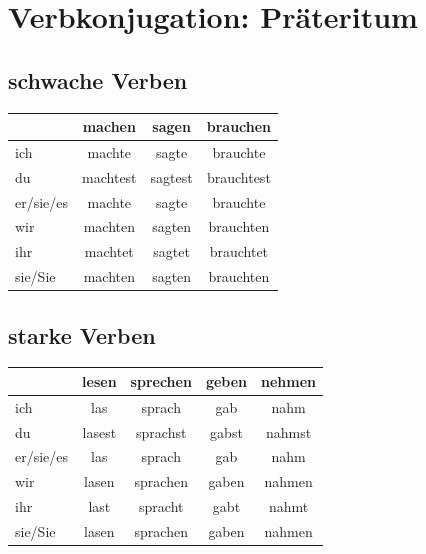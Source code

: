 \section{Verbkonjugation: Präteritum}
\label{sec:KonjugationPraeteritum}

\subsection{schwache Verben}
\label{sec:SchwacheVerbenPraet}

\begin{center}
\begin{tabular}{|l|c|c|c|}
\hline
\textbf{} & \textbf{machen} & \textbf{sagen} & \textbf{brauchen} \\ \hline
ich & machte & sagte & brauchte \\ \hline
du & machtest & sagtest & brauchtest \\ \hline
er/sie/es & machte & sagte & brauchte \\ \hline
wir & machten & sagten & brauchten \\ \hline
ihr & machtet & sagtet & brauchtet \\ \hline
sie/Sie & machten & sagten & brauchten \\ \hline
\end{tabular}
\end{center}

\subsection{starke Verben}
\label{sec:StarkeVerbenPraet}

\begin{center}
\begin{tabular}{|l|c|c|c|c|}
\hline
\textbf{} & \textbf{lesen} & \textbf{sprechen} & \textbf{geben} & \textbf{nehmen} \\ \hline
ich & las & sprach & gab & nahm \\ \hline
du & lasest & sprachst & gabst & nahmst \\ \hline
er/sie/es & las & sprach & gab & nahm \\ \hline
wir & lasen & sprachen & gaben & nahmen \\ \hline
ihr & last & spracht & gabt & nahmt \\ \hline
sie/Sie & lasen & sprachen & gaben & nahmen \\ \hline
\end{tabular}
\end{center}


